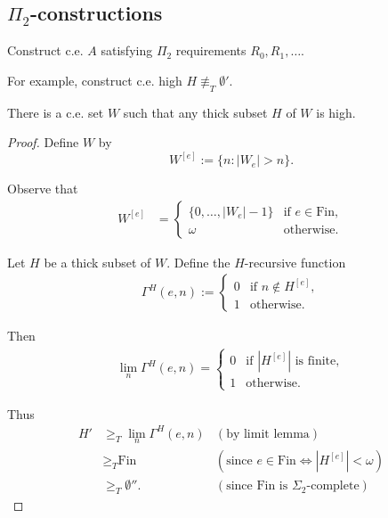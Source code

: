 \subsection{$\Pi_2$-constructions}

\begin{goal}
  Construct c.e. $A$ satisfying $\Pi_2$ requirements $R_0,R_1,\ldots$.
\end{goal}

For example, construct c.e. high $H\not\equiv_T\emptyset'$.
\begin{lemma}[Thickness]
  There is a c.e. set $W$ such that any thick subset $H$ of $W$ is high.
\end{lemma}
\begin{proof}
  Define $W$ by
  \[W^{[e]} :=\{n: |W_e|>n\}.\]

  Observe that
  \begin{align*}
    W^{[e]}&=
    \begin{cases}
      \{0,\ldots,|W_e|-1\} &\text{if } e\in\text{Fin},\\
      \omega &\text{otherwise}.
    \end{cases}
  \end{align*}

  Let $H$ be a thick subset of $W$. Define the $H$-recursive function
  \begin{align*}
    \Gamma^H(e,n):=
    \begin{cases}
      0 &\text{if } n\not\in H^{[e]},\\
      1 &\text{otherwise}.
    \end{cases}
  \end{align*}

  Then
  \begin{align*}
    \lim_n \Gamma^H(e,n)=
    \begin{cases}
      0 &\text{if } |H^{[e]}| \text{ is finite},\\
      1 &\text{otherwise}.
    \end{cases}
  \end{align*}

  Thus
  \begin{align*}
    H' &\geq_T \lim_n \Gamma^H(e,n) &(\text{by limit lemma})\\
    &\geq_T \text{Fin} &(\text{since } e\in\text{Fin} \Leftrightarrow
      |H^{[e]}|<\omega)\\
    &\geq_T \emptyset''. &(\text{since Fin is } \Sigma_2\text{-complete})
  \end{align*}
\end{proof}

